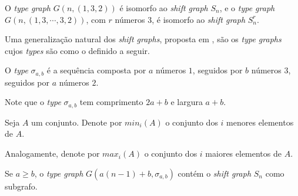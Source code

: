O \textit{type graph} $G(n,(1,3,2))$ é isomorfo ao \textit{shift graph} $S_n$, e o \textit{type graph} $G(n, (1,3,\cdots,3,2))$, com $r$ números $3$, é isomorfo ao \textit{shift graph} $S_n^r$.

Uma generalização natural dos \textit{shift graphs}, proposta em \cite{avart2014generalized}, são os \textit{type graphs} cujos \textit{types} são como o definido a seguir.

\begin{definicao}
O \textit{type} $\sigma_{a,b}$ é a sequência composta por $a$ números $1$, seguidos por $b$ números $3$, seguidos por $a$ números $2$.
\end{definicao}

Note que o \textit{type} $\sigma_{a,b}$ tem comprimento $2a+b$ e largura $a+b$.

\begin{definicao}
Seja $A$ um conjunto. Denote por $min_i(A)$ o conjunto dos $i$ menores elementos de $A$.

Analogamente, denote por $max_i(A)$ o conjunto dos $i$ maiores elementos de $A$.
\end{definicao}

\begin{teorema}\label{typetheorem1}
Se $a\geq b$, o \textit{type graph} $G(a(n-1)+b, \sigma_{a,b})$ contém o \textit{shift graph} $S_n$ como subgrafo.
\end{teorema}

